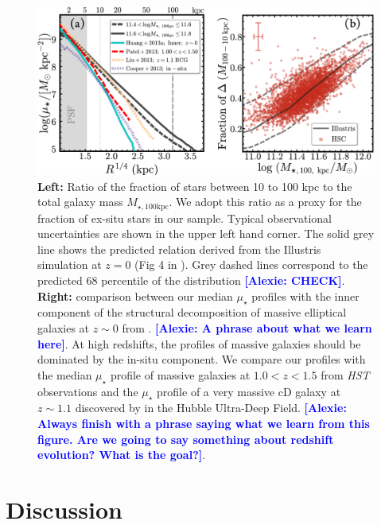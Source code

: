 \documentclass[a4paper,fleqn,usenatbib]{mnras}
\def\mtot{{$M_{\star,100\mathrm{kpc}}$}}
\def\mden{{$\mu_{\star}$}}
\newcommand{\alexie}[1]{\textcolor{blue}{\textbf{[Alexie: #1]}}}
\begin{document}
  \begin{figure}
      \centering 
      \includegraphics[width=\textwidth]{fig/redbcg_insitu_accretion}
      \caption{
          \textbf{Left:} Ratio of the fraction of stars between 10 to 100 kpc to the total galaxy mass \mtot{}. We adopt this ratio as a proxy for the fraction of ex-situ stars in our sample. Typical observational uncertainties are shown in the upper left hand corner. The solid grey line shows the predicted relation  derived from the Illustris simulation at $z=0$ 
          (Fig 4 in \citealt{RodriguezGomez2016}). Grey dashed lines correspond to the predicted 68 percentile of the distribution \alexie{CHECK}. \textbf{Right:} comparison between our median \mden{} profiles with the inner component of the structural decomposition of massive elliptical galaxies at $z{\sim} 0$ from \citet[][Cyan, solid]{Huang2013a}.  \alexie{A phrase about what we learn here}.  At high redshifts,  the profiles of massive galaxies  should be dominated by  the in-situ component.  We compare our profiles with the median \mden{} profile of massive galaxies at $1.0 < z < 1.5$ from \textit{HST} observations \citet[][Red, dashed]{Patel2013} and the \mden{} profile of a very massive cD galaxy at $z{\sim} 1.1$ discovered by \citet[][Yellow, dashed]{Liu2013} in the Hubble Ultra-Deep Field. \alexie{Always finish with a phrase saying what we learn from this figure. Are we going to say something about redshift evolution? What is the goal?}.}
      \label{fig:discussion_1}
  \end{figure}

\section{Discussion}
    \label{sec:discussion}
    
\end{document}
